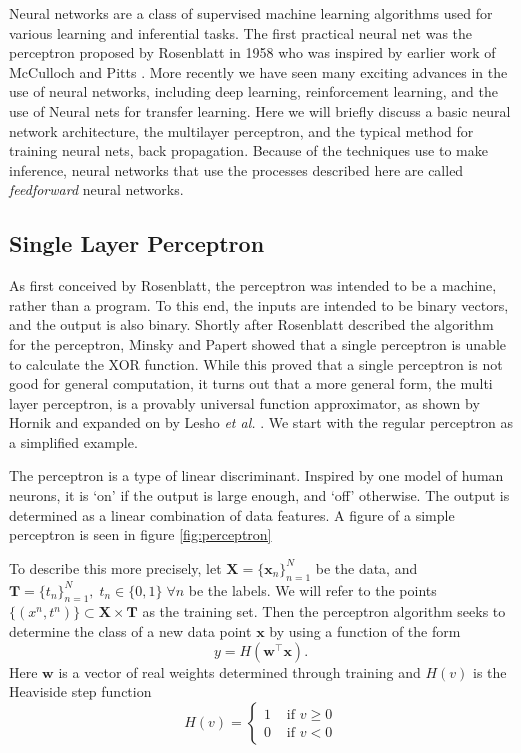 Neural networks are a class of supervised machine learning algorithms used for various learning and inferential tasks.  The first practical neural net was the perceptron proposed by Rosenblatt in 1958 \cite{Rosenblatt58theperceptron} who was inspired by earlier work of McCulloch and Pitts \cite{McCulloch-Pitts}.  More recently we have seen many exciting advances in the use of neural networks, including deep learning, reinforcement learning, and the use of Neural nets for transfer learning.
Here we will briefly discuss a basic neural network architecture, the multilayer perceptron, and the typical method for training neural nets, back propagation.  Because of the techniques use to make inference, neural networks that use the processes described here are called \textit{feedforward} neural networks.
\subsection{Single Layer Perceptron}
As first conceived by Rosenblatt, the perceptron was intended to be a machine, rather than a program. To this end, the inputs are intended to be binary vectors, and the output is also binary.  Shortly after Rosenblatt described the algorithm for the perceptron, Minsky and Papert \cite{Minsky90Perceptron} showed that a single perceptron is unable to calculate the XOR function.  While this proved that a single perceptron is not good for general computation, it turns out that a more general form, the multi layer perceptron, is a provably universal function approximator, as shown by Hornik \cite{HORNIK1991251} and expanded on by Lesho \textit{et al.} \cite{LESHNO1993861}.  We start with the regular perceptron as a simplified example.

The perceptron is a type of linear discriminant.  Inspired by one model of human neurons, it is `on' if the output is large enough, and `off' otherwise.  The output is determined as a linear combination of data features.  A figure of a simple perceptron is seen in figure \ref{fig:perceptron}



To describe this more precisely, let $\bm{X}=\{\bm x_n\}_{n=1}^{N}$ be the data, and \( \bm{T} =\{t_n\}_{n=1}^{N},\; t_n\in \{0,1\} \;\forall n \) be the labels. We will refer to the points \( \{(x^n,t^n)\}\subset\bm{X}\times \bm{T} \) as the training set. Then the perceptron algorithm seeks to determine the class of a new data point \( \bm x \) by using a function of the form
\begin{equation}\label{perceptron}
y = H(\bm w^{\intercal} \bm x).
\end{equation}
Here \( \bm w \) is a vector of real weights determined through training and  \( H(v) \) is the Heaviside step function
\[ H(v) =\begin{cases}
 			1 &\text{ if }v\geq 0\\
 			0 &\text{ if }v<0
		 \end{cases} 
\]

